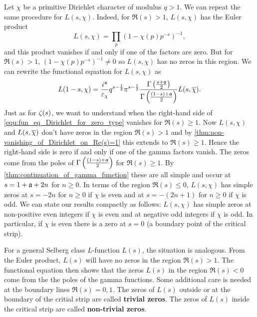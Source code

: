       Let $\chi$ be a primitive Dirichlet character of modulus $q > 1$. We can repeat the same procedure for $L(s,\chi)$. Indeed, for $\Re(s) > 1$, $L(s,\chi)$ has the Euler product
      \[
        L(s,\chi) = \prod_{p}(1-\chi(p)p^{-s})^{-1},
      \]
      and this product vanishes if and only if one of the factors are zero. But for $\Re(s) > 1$, $(1-\chi(p)p^{-s})^{-1} \neq 0$ so $L(s,\chi)$ has no zeros in this region. We can rewrite the functional equation for $L(s,\chi)$ as
      \begin{equation}\label{equ:fun_eq_Dirichlet_for_zero_type}
        L(1-s,\chi) = \frac{i^{\mathfrak{a}}}{\varepsilon_{\chi}}q^{s-\frac{1}{2}}\pi^{s-\frac{1}{2}}\frac{\Gamma\left(\frac{s+\mathfrak{a}}{2}\right)}{\Gamma\left(\frac{(1-s)+\mathfrak{a}}{2}\right)}L(s,\overline{\chi}).
      \end{equation}
      Just as for $\zeta(s)$, we want to understand when the right-hand side of \cref{equ:fun_eq_Dirichlet_for_zero_type} vanishes for $\Re(s) \ge 1$. Now $L(s,\chi)$ and $L(s,\overline{\chi})$ don't have zeros in the region $\Re(s) > 1$ and by \cref{thm:non-vanishing_of_Dirichlet_on_Re(s)=1} this extends to $\Re(s) \ge 1$. Hence the right-hand side is zero if and only if one of the gamma factors vanish. The zeros come from the poles of $\Gamma\left(\frac{(1-s)+\mathfrak{a}}{2}\right)$ for $\Re(s) \ge 1$. By \cref{thm:continuation_of_gamma_function} these are all simple and occur at $s = 1+\mathfrak{a}+2n$ for $n \ge 0$. In terms of the region $\Re(s) \le 0$, $L(s,\chi)$ has simple zeros at $s = -2n$ for $n \ge 0$ if $\chi$ is even and at $s = -(2n+1)$ for $n \ge 0$ if $\chi$ is odd. We can state our results compactly as follows: $L(s,\chi)$ has simple zeros at non-positive even integers if $\chi$ is even and at negative odd integers if $\chi$ is odd. In particular, if $\chi$ is even there is a zero at $s = 0$ (a boundary point of the critical strip).

      For a general Selberg class $L$-function $L(s)$, the situation is analogous. From the Euler product, $L(s)$ will have no zeros in the region $\Re(s) > 1$. The functional equation then shows that the zeros $L(s)$ in the region $\Re(s) < 0$ come from the the poles of the gamma functions. Some additional care is needed at the boundary lines $\Re(s) = 0,1$. The zeros of $L(s)$ outside or at the boundary of the critial strip are called \textbf{trivial zeros}. The zeros of $L(s)$ inside the critical strip are called \textbf{non-trivial zeros}.

